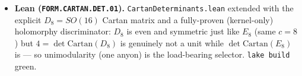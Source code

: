 \documentclass[11pt]{article}
\providecommand{\mE}{\textbf{[E]}}\providecommand{\mC}{\textbf{[C]}}
\begin{document}
\begin{itemize}
central ($0.02195$) but $+1.7\sigma$ vs the with-SK best fit ($0.02215\pm0.00057$), a ${\sim}0.3\sigma$ systematic
spread; \mE\ $0.023108$ lies inside the with-SK $3\sigma$ band (upper $0.02388$), an upper-edge pressure point not
a falsification; \mX\ JUNO's sub-1\% precision turns it into a ${\sim}6\sigma$ kill-or-confirm.
\item \textbf{Lean (\texttt{FORM.CARTAN.DET.01}).} \texttt{CartanDeterminants.lean} extended with the explicit
$D_8=SO(16)$ Cartan matrix and a fully-proven (kernel-only) holomorphy discriminator: $D_8$ is even and symmetric
just like $E_8$ (same $c{=}8$) but $4=\det\mathrm{Cartan}(D_8)$ is genuinely not a unit while $\det\mathrm{Cartan}
(E_8)$ is --- so unimodularity (one anyon) is the load-bearing selector. \texttt{lake build} green.
\end{itemize}
\end{document}
